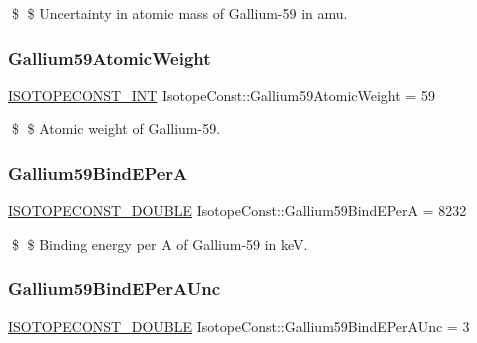 \$ \$ Uncertainty in atomic mass of Gallium-\/59 in amu. \mbox{\label{group___isotope_const-_gallium-_ga59_gaaa383da4526d318a999111986826e646}} 
\subsubsection{\texorpdfstring{Gallium59\+Atomic\+Weight}{Gallium59AtomicWeight}}
{\footnotesize\ttfamily \mbox{\hyperlink{group___isotope_const-_macros_ga5f18360b3e99483a35c32d789e62621c}{I\+S\+O\+T\+O\+P\+E\+C\+O\+N\+S\+T\+\_\+\+I\+NT}} Isotope\+Const\+::\+Gallium59\+Atomic\+Weight = 59}

\$ \$ Atomic weight of Gallium-\/59. \mbox{\label{group___isotope_const-_gallium-_ga59_gaaca3afaac892f5ae67d9c1447d4f784a}} 
\subsubsection{\texorpdfstring{Gallium59\+Bind\+E\+PerA}{Gallium59BindEPerA}}
{\footnotesize\ttfamily \mbox{\hyperlink{group___isotope_const-_macros_ga8f45a7272ce02c0b4c65c44636ed719a}{I\+S\+O\+T\+O\+P\+E\+C\+O\+N\+S\+T\+\_\+\+D\+O\+U\+B\+LE}} Isotope\+Const\+::\+Gallium59\+Bind\+E\+PerA = 8232}

\$ \$ Binding energy per A of Gallium-\/59 in keV. \mbox{\label{group___isotope_const-_gallium-_ga59_ga87a55178193490b806bb665f1185962b}} 
\subsubsection{\texorpdfstring{Gallium59\+Bind\+E\+Per\+A\+Unc}{Gallium59BindEPerAUnc}}
{\footnotesize\ttfamily \mbox{\hyperlink{group___isotope_const-_macros_ga8f45a7272ce02c0b4c65c44636ed719a}{I\+S\+O\+T\+O\+P\+E\+C\+O\+N\+S\+T\+\_\+\+D\+O\+U\+B\+LE}} Isotope\+Const\+::\+Gallium59\+Bind\+E\+Per\+A\+Unc = 3}

